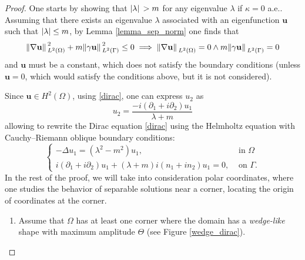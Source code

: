 \begin{proof}
    One starts by showing that \(\abs*{\lambda}>m\) for any eigenvalue \(\lambda\) if \(\kappa = 0\) a.e.. Assuming that there exists an eigenvalue \(\lambda\) associated with an eigenfunction \(\mathbf{u}\) such that \(\abs{\lambda} \leq m\), by Lemma \ref{lemma_sep_norm} one finds that 
    \[
    \norm*{\nabla \mathbf{u} }_{L^2(\Omega)}^2 + m \norm*{\gamma \mathbf{u}}_{L^2(\Gamma)}^2 \leq 0 \implies \norm*{\nabla \mathbf{u} }_{L^2(\Omega)} = 0 \land m \norm*{\gamma \mathbf{u}}_{L^2(\Gamma)} = 0
    \]
    and \(\mathbf{u}\) must be a constant, which does not satisfy the boundary conditions (unless \(\mathbf{u}=0\), which would satisfy the conditions above, but it is not considered).

    Since \(\mathbf{u} \in H^2(\Omega)\), using \eqref{dirac}, one can express \(u_2\) as
    \[
    u_2 = \frac{-i (\partial_1 + i\partial_2)u_1}{\lambda + m}    
    \]
    allowing to rewrite the Dirac equation \eqref{dirac} using the Helmholtz equation with Cauchy–Riemann oblique boundary conditions:
    \begin{equation}\label{helm_system}
        \begin{cases}
            -\Delta u_1 = (\lambda^2 - m^2)u_1, & \text{ in } \Omega\\
             i (\partial_1 + i\partial_2)u_1 + (\lambda + m)i(n_1 + i n_2)u_1 = 0, & \text{ on } \Gamma.
        \end{cases}      
    \end{equation}
    In the rest of the proof, we will take into consideration polar coordinates, where one studies the behavior of separable solutions near a corner, locating the origin of coordinates at the corner. 

    \begin{enumerate}
    \item Assume that \(\Omega\) has at least one corner where the domain has a \textit{wedge-like} shape with maximum amplitude \(\Theta\) (see Figure \ref{wedge_dirac}).
    
    \usetikzlibrary{decorations.pathmorphing}
    \begin{figure}[H]
    \centering
\end{figure}
\end{enumerate}
\end{proof}

